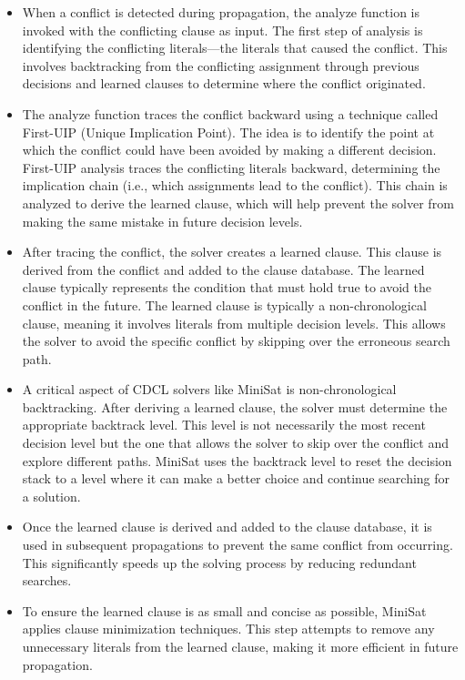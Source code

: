 \documentclass[runningheads]{llncs}
\begin{document}
\begin{itemize}
    \item When a conflict is detected during propagation, the analyze function is invoked with the conflicting clause as input. The first step of analysis is identifying the conflicting literals—the literals that caused the conflict. This involves backtracking from the conflicting assignment through previous decisions and learned clauses to determine where the conflict originated.

\item The analyze function traces the conflict backward using a technique called First-UIP (Unique Implication Point). The idea is to identify the point at which the conflict could have been avoided by making a different decision.
First-UIP analysis traces the conflicting literals backward, determining the implication chain (i.e., which assignments lead to the conflict). This chain is analyzed to derive the learned clause, which will help prevent the solver from making the same mistake in future decision levels.

\item After tracing the conflict, the solver creates a learned clause. This clause is derived from the conflict and added to the clause database. The learned clause typically represents the condition that must hold true to avoid the conflict in the future.
The learned clause is typically a non-chronological clause, meaning it involves literals from multiple decision levels. This allows the solver to avoid the specific conflict by skipping over the erroneous search path.


\item A critical aspect of CDCL solvers like MiniSat is non-chronological backtracking. After deriving a learned clause, the solver must determine the appropriate backtrack level. This level is not necessarily the most recent decision level but the one that allows the solver to skip over the conflict and explore different paths. MiniSat uses the backtrack level to reset the decision stack to a level where it can make a better choice and continue searching for a solution.

\item Once the learned clause is derived and added to the clause database, it is used in subsequent propagations to prevent the same conflict from occurring. This significantly speeds up the solving process by reducing redundant searches.

\item To ensure the learned clause is as small and concise as possible, MiniSat applies clause minimization techniques. This step attempts to remove any unnecessary literals from the learned clause, making it more efficient in future propagation.
\end{itemize}
\end{document}
